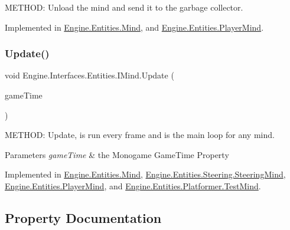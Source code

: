 M\+E\+T\+H\+OD\+: Unload the mind and send it to the garbage collector. 



Implemented in \hyperlink{a00318_a15bf25a4a74706ef37592689f43c0598}{Engine.\+Entities.\+Mind}, and \hyperlink{a00326_a80bacdc33e51129afed33f9e8bd5cd0f}{Engine.\+Entities.\+Player\+Mind}.

\mbox{\label{a00446_a21a0486019d7c7b665fdf483626323f3}} 
\subsubsection{\texorpdfstring{Update()}{Update()}}
{\footnotesize\ttfamily void Engine.\+Interfaces.\+Entities.\+I\+Mind.\+Update (\begin{DoxyParamCaption}\item[{Game\+Time}]{game\+Time }\end{DoxyParamCaption})}



M\+E\+T\+H\+OD\+: Update, is run every frame and is the main loop for any mind. 


\begin{DoxyParams}{Parameters}
{\em game\+Time} & the Monogame Game\+Time Property\\
\hline
\end{DoxyParams}


Implemented in \hyperlink{a00318_adec6999d87accf7371de1536eac2541b}{Engine.\+Entities.\+Mind}, \hyperlink{a00346_a2e1f7ec281cfe2b7e8268a93bec59d4a}{Engine.\+Entities.\+Steering.\+Steering\+Mind}, \hyperlink{a00326_a172dca0ea26dfd821b413f7592a98084}{Engine.\+Entities.\+Player\+Mind}, and \hyperlink{a00334_a1817f5df935d637c737d510e39fd251f}{Engine.\+Entities.\+Platformer.\+Test\+Mind}.



\subsection{Property Documentation}
\mbox{\label{a00446_a50008fc232397651429a06699310ef6f}} 

